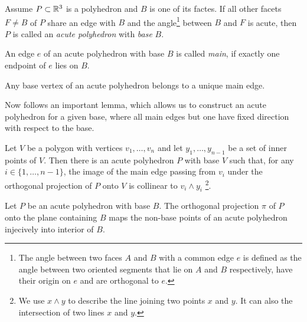 \begin{definition}
  Assume $P \subset \mathbb{R}^3$ is a polyhedron and $B$ is one of its factes. If all other facets $F \neq B$ of $P$ 
  share an edge with $B$ and
  the angle\footnote{The angle between two faces $A$ and $B$ with a common edge $e$ is defined as the angle between two oriented segments that lie on $A$ and $B$ respectively, have their origin on $e$ and are orthogonal to $e$.} between $B$ and $F$ is acute,
  then $P$ is called an \emph{acute polyhedron} with \emph{base} $B$.
\end{definition}

\begin{definition}
  An edge $e$ of an acute polyhedron with base $B$ is called \emph{main}, if exactly one endpoint of $e$ lies on $B$.
\end{definition}

\begin{lemma}
  Any base vertex of an acute polyhedron belongs to a unique main edge.
\end{lemma}

Now follows an important lemma, which allows us to construct an acute polyhedron for a given base, where all main edges but one have fixed direction with respect to the base.
\begin{lemma}\label{lemma:acute-direction}
  Let $V$ be a polygon with vertices $v_1,\dots,v_n$ and let $y_1,\dots,y_{n-1}$ be a set of inner points of $V$.
  Then there is an acute polyhedron $P$ with base $V$ such that, for any $i \in \{1,\dots,n-1\}$, the image of the main edge passing from $v_i$ under the orthogonal projection of $P$ onto $V$ is collinear to $v_i \wedge y_i$ \footnote{We use $x \wedge y$ to describe the line joining two points $x$ and $y$. It can also the intersection of two lines $x$ and $y$.}.
\end{lemma}

\begin{observation}\label{observation:acute-projection}
  Let $P$ be an acute polyhedron with base $B$.
  The orthogonal projection $\pi$ of $P$ onto the plane containing $B$ maps the non-base points of an acute polyhedron injecively into interior of $B$.
\end{observation}

